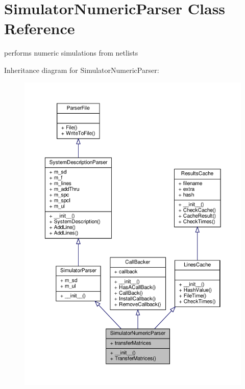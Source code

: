 \hypertarget{classSignalIntegrity_1_1Parsers_1_1SimulatorNumericParser_1_1SimulatorNumericParser}{}\section{Simulator\+Numeric\+Parser Class Reference}
\label{classSignalIntegrity_1_1Parsers_1_1SimulatorNumericParser_1_1SimulatorNumericParser}


performs numeric simulations from netlists  




Inheritance diagram for Simulator\+Numeric\+Parser\+:\nopagebreak
\begin{figure}[H]
\begin{center}
\leavevmode
\includegraphics[width=350pt]{classSignalIntegrity_1_1Parsers_1_1SimulatorNumericParser_1_1SimulatorNumericParser__inherit__graph}
\end{center}
\end{figure}


